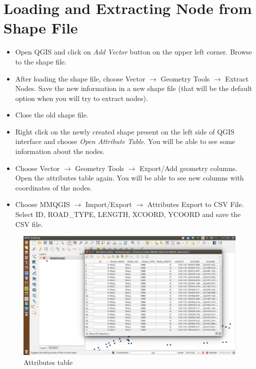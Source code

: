 \documentclass[12pt]{article}
\begin{document}
\section*{Loading and Extracting Node from Shape File}
\begin{itemize}
\item Open QGIS and click on \textit{Add Vector} button on the upper left corner. Browse to the shape file.
\item After loading the shape file, choose Vector $ \rightarrow $ Geometry Tools $ \rightarrow $ Extract Nodes. Save the new information in a new shape file (that will be the default option when you will try to extract nodes).
\item  Close the old shape file.
\item Right click on the newly created shape present on the left side of QGIS interface and choose \textit{Open Attribute Table}. You will be able to see some information about the nodes.
\item Choose Vector $ \rightarrow $ Geometry Tools $ \rightarrow $ Export/Add geometry columns. Open the attributes table again. You will be able to see new columns with coordinates of the nodes.
\item Choose MMQGIS $ \rightarrow $ Import/Export $ \rightarrow $ Attributes Export to CSV File. Select ID, ROAD\_TYPE, LENGTH, XCOORD, YCOORD and save the CSV file.
\end{itemize}

\begin{figure}
\centering
\includegraphics[scale=.25]{qgis02.png}
\caption{Attributes table}
\end{figure}
\end{document}
